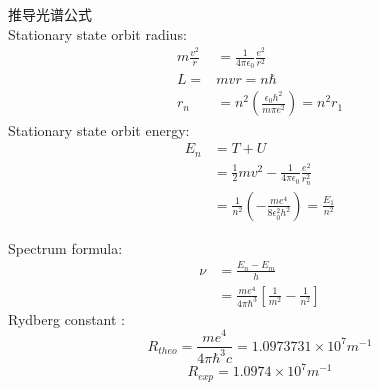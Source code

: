 \begin{frame}   
    \frametitle{}
    推导光谱公式\\
    {\Bullet} Stationary state orbit radius:
    \begin{equation*}
        \begin{split}
            m\frac{v^2}{r}&=\frac{1}{4\pi\epsilon_0} \frac{e^2}{r^2} \\
            L=&mvr =n\hbar \\
            r_n&= n^2 (\frac{\epsilon_0 h^2}{m\pi e^2}) =n^2 r_1   
        \end{split} 
     \end{equation*}
     {\Bullet} Stationary state orbit energy: 
     \begin{equation*}
        \begin{split}
            E_n &= T + U \\
            &= \frac{1}{2}mv^2- \frac{1}{4\pi\epsilon_0} \frac{e^2}{r_n ^2} \\
            &= \frac{1}{n^2} (-\frac{m e^4}{8 \epsilon_0 ^2 h^2}) = \frac{E_1}{n^2}
        \end{split}  
     \end{equation*}
\end{frame}

\begin{frame}
    {\Bullet} Spectrum formula: 
    \begin{equation*}
        \begin{split}
         \nu&=\frac{E_n -E_m}{h} \\
         &= \frac{m e^4}{4\pi \hbar ^3} [\frac{1}{m^2} -\frac{1}{n^2}]
        \end{split}  
     \end{equation*}
     {\Bullet} Rydberg constant : 
     \[R_{theo}= \frac{m e^4}{4\pi \hbar ^3 c} =1.0973731\times 10^7 m^{-1}\]
    \[R_{exp}=1.0974\times10^7 m^{-1} \]  
\end{frame}

